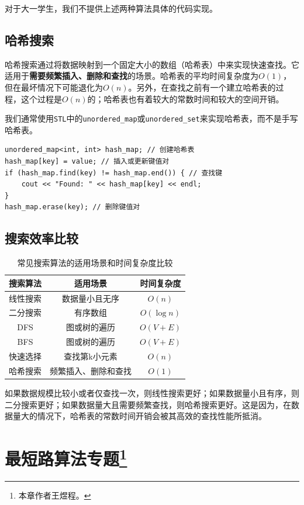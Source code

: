 \documentclass{article}
\begin{document}
对于大一学生，我们不提供上述两种算法具体的代码实现。

\subsection{哈希搜索}

哈希搜索通过将数据映射到一个固定大小的数组（哈希表）中来实现快速查找。它适用于\textbf{需要频繁插入、删除和查找}的场景。哈希表的平均时间复杂度为$O(1)$，但在最坏情况下可能退化为$O(n)$。另外，在查找之前有一个建立哈希表的过程，这个过程是$O(n)$的；哈希表也有着较大的常数时间和较大的空间开销。

我们通常使用\texttt{STL}中的\texttt{unordered\_map}或\texttt{unordered\_set}来实现哈希表，而不是手写哈希表。

\begin{lstlisting}
unordered_map<int, int> hash_map; // 创建哈希表
hash_map[key] = value; // 插入或更新键值对
if (hash_map.find(key) != hash_map.end()) { // 查找键
    cout << "Found: " << hash_map[key] << endl;
}
hash_map.erase(key); // 删除键值对
\end{lstlisting}

\subsection{搜索效率比较}

\begin{table}[ht]
  \centering
  \begin{tabular}{c|c|c}
    \hline
    搜索算法 & 适用场景 & 时间复杂度 \\
    \hline
    线性搜索 & 数据量小且无序 & $O(n)$ \\
    二分搜索 & 有序数组 & $O(\log n)$ \\
    DFS & 图或树的遍历 & $O(V + E)$ \\
    BFS & 图或树的遍历 & $O(V + E)$ \\
    快速选择 & 查找第k小元素 & $O(n)$ \\
    哈希搜索 & 频繁插入、删除和查找 & $O(1)$ \\
    \hline
  \end{tabular}
  \caption{常见搜索算法的适用场景和时间复杂度比较}
\end{table}
如果数据规模比较小或者仅查找一次，则线性搜索更好；如果数据量小且有序，则二分搜索更好；如果数据量大且需要频繁查找，则哈希搜索更好。这是因为，在数据量大的情况下，哈希表的常数时间开销会被其高效的查找性能所抵消。

\section[最短路算法专题]{最短路算法专题\protect\footnote{本章作者王煜程。}}
\end{document}
